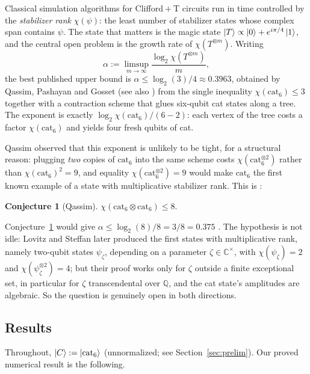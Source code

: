 \documentclass[11pt]{article}
\theoremstyle{plain}
\theoremstyle{definition}
\newtheorem{conjecture}[theorem]{Conjecture}
\newcommand{\C}{\mathbb{C}}
\newcommand{\Q}{\mathbb{Q}}
\newcommand{\cat}{\mathrm{cat}}
\begin{document}
Classical simulation algorithms for Clifford${}+{}$T circuits run in time controlled by
the \emph{stabilizer rank} $\chi(\psi)$: the least number of stabilizer states whose
complex span contains $\psi$. The state that matters is the magic state
$\ket{T}\propto\ket{0}+e^{i\pi/4}\ket{1}$, and the central open problem is the growth
rate of $\chi(T^{\otimes m})$. Writing
\[
\alpha:=\limsup_{m\to\infty}\frac{\log_2\chi(T^{\otimes m})}{m},
\]
the best published upper bound is $\alpha\le\log_2(3)/4\approx0.3963$, obtained by
Qassim, Pashayan and Gosset \cite{QPG2021} (see also \cite[Thm.~11]{QassimThesis}) from
the single inequality $\chi(\cat_6)\le3$ together with a contraction scheme that glues
six-qubit cat states along a tree. The exponent is exactly
$\log_2\chi(\cat_6)/(6-2)$: each vertex of the tree costs a factor $\chi(\cat_6)$ and
yields four fresh qubits of cat.

Qassim observed that this exponent is unlikely to be tight, for a structural reason:
plugging \emph{two} copies of $\cat_6$ into the same scheme costs
$\chi(\cat_6^{\otimes2})$ rather than $\chi(\cat_6)^2=9$, and equality
$\chi(\cat_6^{\otimes2})=9$ would make $\cat_6$ the first known example of a state with
multiplicative stabilizer rank. This is \cite[Eq.~(4.30)]{QassimThesis}:

\begin{conjecture}[Qassim]\label{conj:main}
$\chi(\cat_6\otimes\cat_6)\le 8$.
\end{conjecture}

\noindent Conjecture~\ref{conj:main} would give
$\alpha\le\log_2(8)/8=3/8=0.375$ \cite[Eq.~(4.31)]{QassimThesis}. The hypothesis is not
idle: Lovitz and Steffan \cite{LovitzSteffan2022} later produced the first states with
multiplicative rank, namely two-qubit states $\psi_\zeta$, depending on a parameter $\zeta\in\C^\times$, with
$\chi(\psi_\zeta)=2$ and $\chi(\psi_\zeta^{\otimes2})=4$; but their proof works only for
$\zeta$ outside a finite exceptional set, in particular for $\zeta$ transcendental over
$\Q$, and the
cat state's amplitudes are algebraic. So the question is genuinely open in both
directions.

\subsection{Results}

Throughout, $\ket{C}:=\ket{\cat_6}$ (unnormalized; see Section~\ref{sec:prelim}).
Our proved numerical result is the following.
\end{document}
